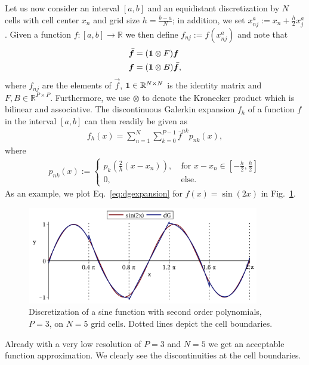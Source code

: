 Let us now consider an interval $[a,b]$ and an equidistant discretization
by $N$ cells with cell center $x_n$ and grid size $h=\frac{b-a}{N}$; in addition, we set $x_{nj}^a := x_n + \frac{h}{2}x^a_j$.
Given a function $f:[a,b]\rightarrow \mathbb{R}$ we then define
$f_{nj} := f(x^a_{nj})$ and note that
\begin{subequations}
\begin{align}
    \bar{ {\boldsymbol{f}}} &= (\mathbf{1}\otimes F) {\boldsymbol{f}} \\
    {\boldsymbol{f}} &= (\mathbf{1}\otimes B) \bar{{\boldsymbol{f}}},
    \label{}
\end{align}
\end{subequations}
where $f_{nj}$ are the elements of $\vec f$,
 $\mathbf{1}\in\mathbb{R}^{N\times N}$ is the identity matrix and $F,B\in\mathbb{R}^{P\times P}$. Furthermore, we use
$\otimes$ to denote the Kronecker product which is bilinear and associative. 
The discontinuous Galerkin expansion $f_h$ of a function $f$ in the interval $[a,b]$ can 
then readily be given as
\begin{align}
    f_h(x) = \sum_{n=1}^N \sum_{k=0}^{P-1} \bar f^{nk} p_{nk}(x),
    \label{eq:dgexpansion}
\end{align}
where
\begin{align}
    p_{nk}(x) := \begin{cases}
        p_k\left(  \frac{2}{h}(x-x_n)\right),& \ \text{for } x-x_n\in\left[ -\frac{h}{2}, \frac{h}{2} \right]\\
        0,& \ \text{else}.
    \end{cases}
    \label{}
\end{align}
As an example, we plot Eq.~\eqref{eq:dgexpansion} for $f(x)=\sin(2x)$ in Fig.~\ref{fig:discretization}. 
\begin{figure}[htpb]
    \includegraphics[width= 0.9\textwidth]{discretization.pdf}
    \caption{ 
    Discretization of a sine function with second order polynomials, $P=3$, 
    on $N=5$ grid cells. Dotted lines depict the cell boundaries. 
    }
    \label{fig:discretization}
\end{figure}
Already with a very low resolution of $P=3$ and $N=5$ 
we get an acceptable function approximation. We clearly see the discontinuities
at the cell boundaries. 

